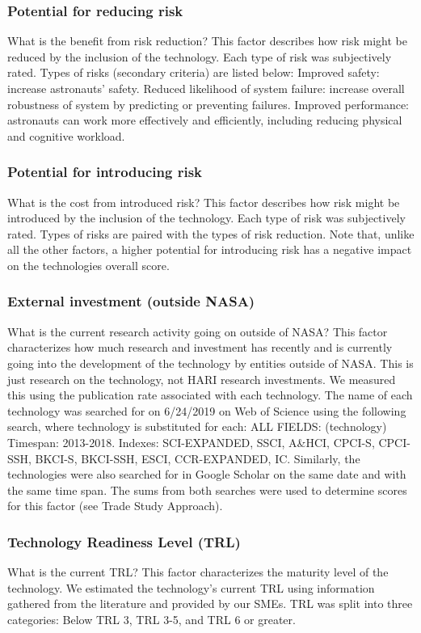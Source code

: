 \subsubsection{Potential for reducing risk}
What is the benefit from risk reduction? This factor describes how risk might be reduced by the inclusion of the technology. Each type of risk was subjectively rated. Types of risks (secondary criteria) are listed below:
	Improved safety: increase astronauts’ safety.
	Reduced likelihood of system failure: increase overall robustness of system by predicting or preventing failures.
	Improved performance: astronauts can work more effectively and efficiently, including reducing physical and cognitive workload.

\subsubsection{Potential for introducing risk}
What is the cost from introduced risk? This factor describes how risk might be introduced by the inclusion of the technology. Each type of risk was subjectively rated. Types of risks are paired with the types of risk reduction. Note that, unlike all the other factors, a higher potential for introducing risk has a negative impact on the technologies overall score.

\subsubsection{External investment (outside NASA)}
What is the current research activity going on outside of NASA? This factor characterizes how much research and investment has recently and is currently going into the development of the technology by entities outside of NASA. This is just research on the technology, not HARI research investments. We measured this using the publication rate associated with each technology. The name of each technology was searched for on 6/24/2019 on Web of Science using the following search, where technology is substituted for each:
	ALL FIELDS: (technology)
	Timespan: 2013-2018. Indexes: SCI-EXPANDED, SSCI, A\&HCI, CPCI-S, CPCI-SSH, BKCI-S, BKCI-SSH, ESCI, CCR-EXPANDED, IC.
Similarly, the technologies were also searched for in Google Scholar on the same date and with the same time span. The sums from both searches were used to determine scores for this factor (see Trade Study Approach).

\subsubsection{Technology Readiness Level (TRL)}
What is the current TRL? This factor characterizes the maturity level of the technology. We estimated the technology's current TRL using information gathered from the literature and provided by our SMEs. TRL was split into three categories: Below TRL 3, TRL 3-5, and TRL 6 or greater.

